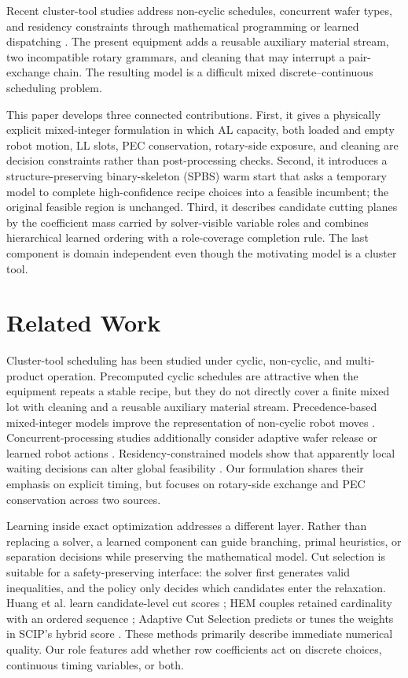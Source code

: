 \documentclass{ifacconf}
\begin{document}
Recent cluster-tool studies address non-cyclic schedules, concurrent wafer types, and residency constraints through mathematical programming or learned dispatching \citep{ahn2025cluster,kim2025adaptive,li2025cyclic,yang2025residency}. The present equipment adds a reusable auxiliary material stream, two incompatible rotary grammars, and cleaning that may interrupt a pair-exchange chain. The resulting model is a difficult mixed discrete--continuous scheduling problem.

This paper develops three connected contributions. First, it gives a physically explicit mixed-integer formulation in which AL capacity, both loaded and empty robot motion, LL slots, PEC conservation, rotary-side exposure, and cleaning are decision constraints rather than post-processing checks. Second, it introduces a structure-preserving binary-skeleton (SPBS) warm start that asks a temporary model to complete high-confidence recipe choices into a feasible incumbent; the original feasible region is unchanged. Third, it describes candidate cutting planes by the coefficient mass carried by solver-visible variable roles and combines hierarchical learned ordering with a role-coverage completion rule. The last component is domain independent even though the motivating model is a cluster tool.

\section{Related Work}

Cluster-tool scheduling has been studied under cyclic, non-cyclic, and multi-product operation. Precomputed cyclic schedules are attractive when the equipment repeats a stable recipe, but they do not directly cover a finite mixed lot with cleaning and a reusable auxiliary material stream. Precedence-based mixed-integer models improve the representation of non-cyclic robot moves \citep{ahn2025cluster}. Concurrent-processing studies additionally consider adaptive wafer release or learned robot actions \citep{kim2025adaptive}. Residency-constrained models show that apparently local waiting decisions can alter global feasibility \citep{li2025cyclic,yang2025residency}. Our formulation shares their emphasis on explicit timing, but focuses on rotary-side exchange and PEC conservation across two sources.

Learning inside exact optimization addresses a different layer. Rather than replacing a solver, a learned component can guide branching, primal heuristics, or separation decisions while preserving the mathematical model. Cut selection is suitable for a safety-preserving interface: the solver first generates valid inequalities, and the policy only decides which candidates enter the relaxation. Huang et al. learn candidate-level cut scores \citep{huang2022learning}; HEM couples retained cardinality with an ordered sequence \citep{wang2023hem}; Adaptive Cut Selection predicts or tunes the weights in SCIP's hybrid score \citep{turner2023adaptive}. These methods primarily describe immediate numerical quality. Our role features add whether row coefficients act on discrete choices, continuous timing variables, or both.
\end{document}
